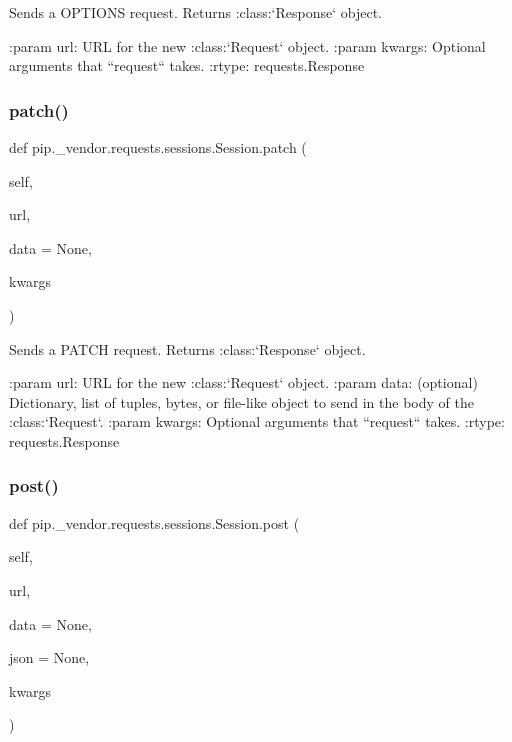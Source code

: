\begin{DoxyVerb}Sends a OPTIONS request. Returns :class:`Response` object.

:param url: URL for the new :class:`Request` object.
:param \*\*kwargs: Optional arguments that ``request`` takes.
:rtype: requests.Response
\end{DoxyVerb}
 \mbox{\label{classpip_1_1__vendor_1_1requests_1_1sessions_1_1Session_ac4b46c599a30356a040031ca79025423}} 
\subsubsection{\texorpdfstring{patch()}{patch()}}
{\footnotesize\ttfamily def pip.\+\_\+vendor.\+requests.\+sessions.\+Session.\+patch (\begin{DoxyParamCaption}\item[{}]{self,  }\item[{}]{url,  }\item[{}]{data = {\ttfamily None},  }\item[{}]{kwargs }\end{DoxyParamCaption})}

\begin{DoxyVerb}Sends a PATCH request. Returns :class:`Response` object.

:param url: URL for the new :class:`Request` object.
:param data: (optional) Dictionary, list of tuples, bytes, or file-like
    object to send in the body of the :class:`Request`.
:param \*\*kwargs: Optional arguments that ``request`` takes.
:rtype: requests.Response
\end{DoxyVerb}
 \mbox{\label{classpip_1_1__vendor_1_1requests_1_1sessions_1_1Session_adc9a865f568b11d76956ebe63f38186d}} 
\subsubsection{\texorpdfstring{post()}{post()}}
{\footnotesize\ttfamily def pip.\+\_\+vendor.\+requests.\+sessions.\+Session.\+post (\begin{DoxyParamCaption}\item[{}]{self,  }\item[{}]{url,  }\item[{}]{data = {\ttfamily None},  }\item[{}]{json = {\ttfamily None},  }\item[{}]{kwargs }\end{DoxyParamCaption})}

